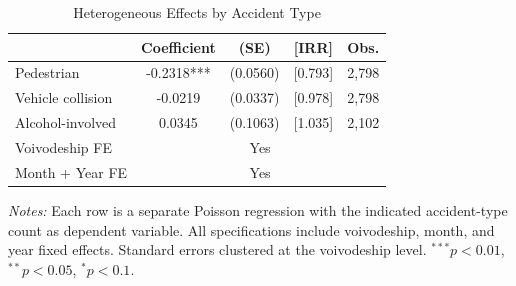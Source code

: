 \begin{table}[htbp]
\centering
\caption{Heterogeneous Effects by Accident Type}
\label{tab:heterogeneity}
\begin{tabular}{lcccc}
\hline\hline
 & Coefficient & (SE) & [IRR] & Obs. \\
\hline
  Pedestrian & -0.2318*** & (0.0560) & [0.793] & 2,798 \\
  Vehicle collision & -0.0219 & (0.0337) & [0.978] & 2,798 \\
  Alcohol-involved & 0.0345 & (0.1063) & [1.035] & 2,102 \\
\hline
  Voivodeship FE & \multicolumn{4}{c}{Yes} \\
  Month + Year FE & \multicolumn{4}{c}{Yes} \\
\hline\hline
\end{tabular}
\begin{tablenotes}[flushleft]
\small
\item \textit{Notes:} Each row is a separate Poisson regression with the indicated accident-type count as dependent variable. All specifications include voivodeship, month, and year fixed effects. Standard errors clustered at the voivodeship level. $^{***}p<0.01$, $^{**}p<0.05$, $^{*}p<0.1$.
\end{tablenotes}
\end{table}

